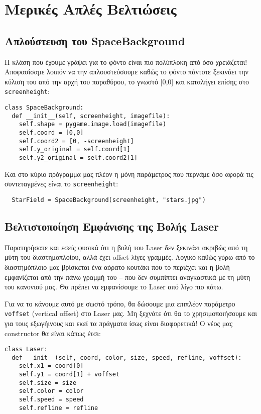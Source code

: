 \section{Μερικές Απλές Βελτιώσεις}

\subsection{Απλούστευση του SpaceBackground}
Η κλάση που έχουμε γράψει για το φόντο είναι πιο πολύπλοκη από όσο χρειάζεται!
Αποφασίσαμε λοιπόν να την απλουστεύσουμε καθώς το φόντο πάντοτε ξεκινάει την
κύλιση του από την αρχή του παραθύρου, το γνωστό [0,0] και καταλήγει επίσης
στο {\tt screenheight}:

\begin{verbatim}
class SpaceBackground:
  def __init__(self, screenheight, imagefile):
    self.shape = pygame.image.load(imagefile)
    self.coord = [0,0]
    self.coord2 = [0, -screenheight]
    self.y_original = self.coord[1]
    self.y2_original = self.coord2[1]
\end{verbatim}

Και στο κύριο πρόγραμμα μας πλέον η μόνη παράμετρος που περνάμε όσο αφορά τις συντεταγμένες είναι το {\tt screenheight}:

\begin{verbatim}
  StarField = SpaceBackground(screenheight, "stars.jpg")
\end{verbatim}

\subsection{Βελτιστοποίηση Εμφάνισης της Βολής Laser}
Παρατηρήσατε και εσείς φυσικά ότι η βολή του Laser δεν ξεκινάει ακριβώς από τη μύτη του διαστημοπλοίου, αλλά έχει offset λίγες γραμμές. Λογικό καθώς γύρω από το διαστημόπλοιο μας βρίσκεται ένα αόρατο κουτάκι που το περιέχει και η βολή εμφανίζεται από την πάνω γραμμή του -- που δεν συμπίπτει αναγκαστικά με τη μύτη του κανονιού μας. Θα πρέπει να εμφανίσουμε το Laser από λίγο πιο κάτω.

Για να το κάνουμε αυτό με σωστό τρόπο\texttrademark, θα δώσουμε μια επιπλέον παράμετρο {\tt voffset} (vertical offset) στο Laser μας. Μη ξεχνάτε ότι θα το χρησιμοποιήσουμε και για τους εξωγήινους και εκεί τα πράγματα ίσως είναι διαφορετικά! Ο νέος μας constructor θα είναι κάπως έτσι:

\begin{verbatim}
class Laser:
  def __init__(self, coord, color, size, speed, refline, voffset):
    self.x1 = coord[0]
    self.y1 = coord[1] + voffset
    self.size = size
    self.color = color
    self.speed = speed
    self.refline = refline
\end{verbatim}

